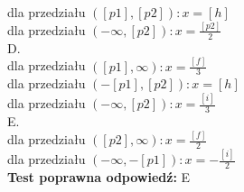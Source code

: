 \documentclass[12pt, a4paper]{article}
\theoremstyle{definition} %
\newcommand{\testStop}{\newline} %
\newcommand{\kluczStart}{\noindent \textbf{Test poprawna odpowiedź:}\newline} %
\newcommand{\kluczStop}{\newline} %
\begin{document}
dla przedziału $([p1],[p2]):  x  = [h] $\\
dla przedziału $(-\infty,[p2]):  x  = \frac{[p2]}{2} $\\
D.\\
dla przedziału $([p1],\infty):  x  = \frac{[f]}{3} $\\
dla przedziału $(-[p1],[p2]):  x  = [h] $\\
dla przedziału $(-\infty,[p2]):  x  = \frac{[i]}{3} $\\
E.\\
dla przedziału $([p2],\infty):  x  = \frac{[f]}{2} $\\
dla przedziału $(-\infty,-[p1]):  x  = -\frac{[i]}{2} $\\
\testStop
\kluczStart
E
\kluczStop
\end{document}
